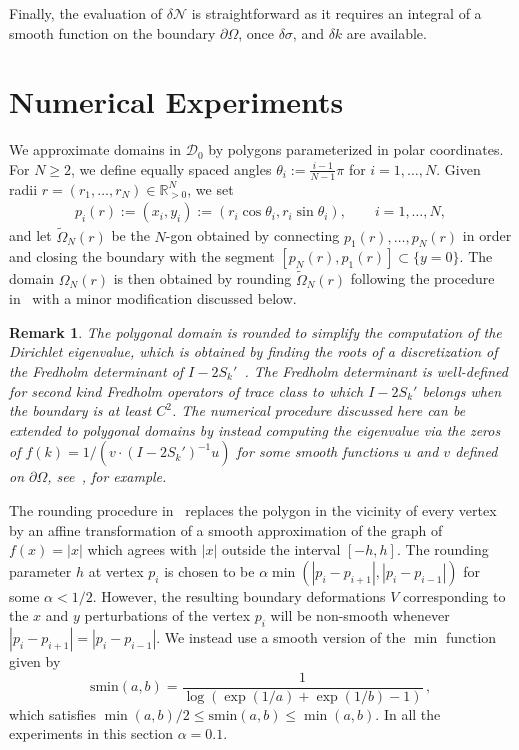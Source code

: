 \documentclass{amsart}
\theoremstyle{plain}
\newtheorem{remark}[theorem]{Remark}
\begin{document}
Finally, the evaluation of $\delta \mathcal{N}$ is straightforward as it requires an integral of a smooth function on the boundary $\partial \Omega$, once $\delta \sigma$, and $\delta k$ are available. 

\section{Numerical Experiments}\label{sec:numerics}
We approximate domains in $\mathcal{D}_0$ by polygons parameterized in polar coordinates.
For $N\ge 2$, we define equally spaced angles $\theta_i:=\frac{i-1}{N-1}\pi$ for $i=1,\dots,N$.
Given radii $r=(r_1,\dots,r_N)\in\mathbb{R}_{>0}^N$, we set
  \begin{align}
    p_i(r):=(x_i,y_i):=(r_i\cos\theta_i,r_i\sin\theta_i),\quad\quad i=1,\dots,N,
  \end{align}
and let $\tilde{\Omega}_N(r)$ be the $N$-gon obtained by connecting $p_1(r),\dots,p_N(r)$ in order and closing the boundary with the segment $[p_N(r),p_1(r)]\subset\{y=0\}$. The domain $\Omega_{N}(r)$ is then obtained by rounding $\tilde{\Omega}_{N}(r)$ following the procedure in~\cite{epstein2016smoothed} with a minor modification discussed below. 
\begin{remark}
The polygonal domain is rounded to simplify the computation of the Dirichlet eigenvalue, which is obtained by finding the roots of a discretization of the Fredholm determinant of $I - 2S_{k}'$~\cite{zhao2015robust}. The Fredholm determinant is well-defined for second kind Fredholm operators of trace class to which $I-2S_{k}'$ belongs when the boundary is at least $C^{2}$. The numerical procedure discussed here can be extended to polygonal domains by instead computing the eigenvalue via the zeros of $f(k) = 1/(v \cdot (I-2S_{k}')^{-1}u)$ for some smooth functions $u$ and $v$ defined on $\partial \Omega$, see~\cite{cheng2004fast,lai2018second}, for example.
\end{remark}

The rounding procedure in~\cite{epstein2016smoothed} replaces the polygon in the vicinity of every vertex by an affine transformation of a smooth approximation of the graph of $f(x) = |x|$ which agrees with $|x|$ outside the interval $[-h,h]$. The rounding parameter $h$ at vertex $p_{i}$ is chosen to be $\alpha \min(|p_{i} - p_{i+1}|, |p_{i} - p_{i-1}|)$ for some $\alpha <1/2$. However, the resulting boundary deformations $V$ corresponding to the $x$ and $y$ perturbations of the vertex $p_{i}$ will be non-smooth whenever $|p_{i} - p_{i+1}| = |p_{i} - p_{i-1}|$. We instead use a smooth version of the $\min$ function  given by $$\textrm{smin}(a,b) = \frac{1}{\log{(\exp{(1/a)} + \exp{(1/b)} -1)}}\,,$$
which satisfies $\min(a,b)/2 \leq \textrm{smin}(a,b) \leq \min(a,b)$. In all the experiments in this section $\alpha = 0.1$.
\end{document}
